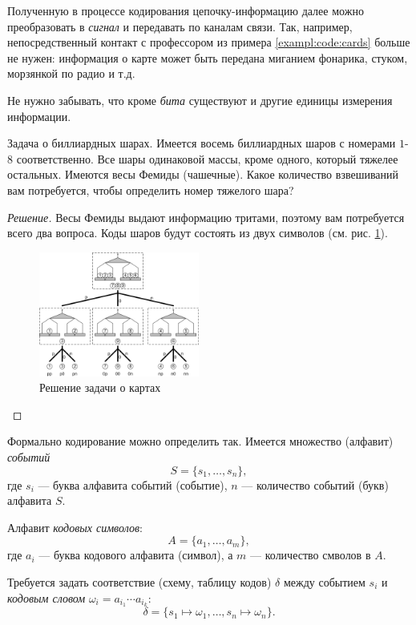 Полученную в процессе кодирования цепочку-информацию далее можно преобразовать в \emph{сигнал} и передавать по каналам связи. Так, например, непосредственный контакт с профессором из примера \ref{exampl:code:cards} больше не нужен: информация о карте может быть передана миганием фонарика, стуком, морзянкой по радио и т.д.

Не нужно забывать, что кроме \emph{бита} существуют и другие единицы измерения информации.
\begin{exampl}
    \label{exampl:code:femida}
    Задача о биллиардных шарах. Имеется восемь биллиардных шаров с номерами $1$-$8$ соответственно. Все шары одинаковой массы, кроме одного, который тяжелее остальных. Имеются весы Фемиды (чашечные). Какое количество взвешиваний вам потребуется, чтобы определить номер тяжелого шара?
\end{exampl}
\begin{proof}[Решение] 
    Весы Фемиды выдают информацию тритами, поэтому вам потребуется всего два вопроса. Коды шаров будут состоять из двух символов (см. рис. \ref{fig:code:femida}).
    \begin{figure}
        \centering
        \includegraphics[width=0.47\textwidth]{fig/femida}
        \caption{Решение задачи о картах}
        \label{fig:code:femida}
    \end{figure}    
\end{proof}

Формально кодирование можно определить так. Имеется множество (алфавит) \emph{событий} 
\[
    S=\{s_1,\ldots,s_n\},
\] где $s_i$ --- буква алфавита событий (событие), $n$ --- количество событий (букв) алфавита $S$.

Алфавит \emph{кодовых символов}:
\[
    A=\{a_1,\ldots,a_m\},
\] где $a_i$ --- буква кодового алфавита (символ), а $m$ --- количество смволов в $A$. 

Требуется задать соответствие (схему, таблицу кодов) $\delta$ между событием $s_i$ и \emph{кодовым словом} $\omega_i=a_{i_1}\cdots a_{i_k}$:
\[
    \delta=\{ s_1\mapsto\omega_1, \ldots, s_n\mapsto\omega_n\}.
\]

